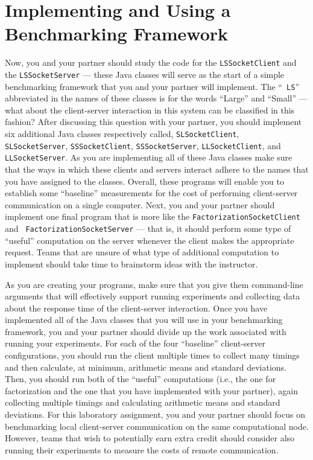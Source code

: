 \section*{Implementing and Using a Benchmarking Framework}

Now, you and your partner should study the code for the {\tt LSSocketClient} and the {\tt LSSocketServer} --- these Java
classes will serve as the start of a simple benchmarking framework that you and your partner will implement. The ``{\tt
LS}'' abbreviated in the names of these classes is for the words ``Large'' and ``Small'' --- what about the
client-server interaction in this system can be classified in this fashion? After discussing this question with your
partner, you should implement six additional Java classes respectively called, {\tt SLSocketClient}, {\tt
SLSocketServer}, {\tt SSSocketClient}, {\tt SSSocketServer}, {\tt LLSocketClient}, and {\tt LLSocketServer}. As you are
implementing all of these Java classes make sure that the ways in which these clients and servers interact adhere to the
names that you have assigned to the classes. Overall, these programs will enable you to establish some ``baseline''
measurements for the cost of performing client-server communication on a single computer. Next, you and your partner
should implement one final program that is more like the {\tt FactorizationSocketClient} and {\tt
FactorizationSocketServer} --- that is, it should perform some type of ``useful'' computation on the server whenever the
client makes the appropriate request. Teams that are unsure of what type of additional computation to
implement should take time to brainstorm ideas with the instructor.

As you are creating your programs, make sure that you give them command-line arguments that will effectively support
running experiments and collecting data about the response time of the client-server interaction. Once you have
implemented all of the Java classes that you will use in your benchmarking framework, you and your partner should divide
up the work associated with running your experiments. For each of the four ``baseline'' client-server configurations,
you should run the client multiple times to collect many timings and then calculate, at minimum, arithmetic means and
standard deviations. Then, you should run both of the ``useful'' computations (i.e., the one for factorization and the
one that you have implemented with your partner), again collecting multiple timings and calculating arithmetic means and
standard deviations. For this laboratory assignment, you and your partner should focus on benchmarking local
client-server communication on the same computational node. However, teams that wish to potentially earn extra credit
should consider also running their experiments to measure the costs of remote communication.

